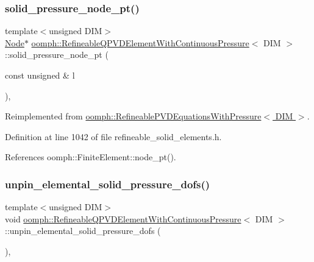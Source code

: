 \subsubsection{\texorpdfstring{solid\+\_\+pressure\+\_\+node\+\_\+pt()}{solid\_pressure\_node\_pt()}}
{\footnotesize\ttfamily template$<$unsigned D\+IM$>$ \\
\hyperlink{classoomph_1_1Node}{Node}$\ast$ \hyperlink{classoomph_1_1RefineableQPVDElementWithContinuousPressure}{oomph\+::\+Refineable\+Q\+P\+V\+D\+Element\+With\+Continuous\+Pressure}$<$ D\+IM $>$\+::solid\+\_\+pressure\+\_\+node\+\_\+pt (\begin{DoxyParamCaption}\item[{const unsigned \&}]{l }\end{DoxyParamCaption})\hspace{0.3cm}{\ttfamily [inline]}, {\ttfamily [virtual]}}



Reimplemented from \hyperlink{classoomph_1_1RefineablePVDEquationsWithPressure_a4e94b11315f8345030fa4b3b923bd91b}{oomph\+::\+Refineable\+P\+V\+D\+Equations\+With\+Pressure$<$ D\+I\+M $>$}.



Definition at line 1042 of file refineable\+\_\+solid\+\_\+elements.\+h.



References oomph\+::\+Finite\+Element\+::node\+\_\+pt().

\mbox{\label{classoomph_1_1RefineableQPVDElementWithContinuousPressure_a7dd0d23afdb19626b2eb1ddfa0dc9612}} 
\subsubsection{\texorpdfstring{unpin\+\_\+elemental\+\_\+solid\+\_\+pressure\+\_\+dofs()}{unpin\_elemental\_solid\_pressure\_dofs()}}
{\footnotesize\ttfamily template$<$unsigned D\+IM$>$ \\
void \hyperlink{classoomph_1_1RefineableQPVDElementWithContinuousPressure}{oomph\+::\+Refineable\+Q\+P\+V\+D\+Element\+With\+Continuous\+Pressure}$<$ D\+IM $>$\+::unpin\+\_\+elemental\+\_\+solid\+\_\+pressure\+\_\+dofs (\begin{DoxyParamCaption}{ }\end{DoxyParamCaption})\hspace{0.3cm}{\ttfamily [inline]}, {\ttfamily [virtual]}}



